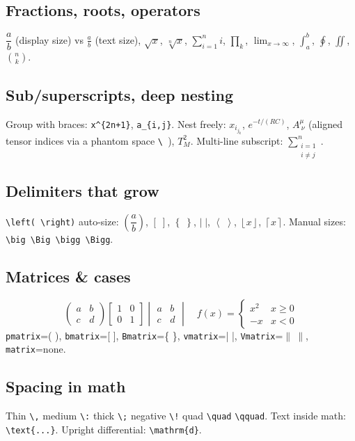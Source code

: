 \documentclass[11pt]{article}
\theoremstyle{plain}
\theoremstyle{definition}
\theoremstyle{remark}
\begin{document}
\subsection{Fractions, roots, operators}
$\dfrac{a}{b}$ (display size) vs $\tfrac{a}{b}$ (text size),
$\sqrt{x}$, $\sqrt[n]{x}$, $\displaystyle\sum_{i=1}^{n} i$,
$\displaystyle\prod_{k}$, $\displaystyle\lim_{x\to\infty}$,
$\displaystyle\int_a^b$, $\oint$, $\iint$, $\binom{n}{k}$.

\subsection{Sub/superscripts, deep nesting}
Group with braces: \verb|x^{2n+1}|, \verb|a_{i,j}|. Nest freely:
$x_{i_{j_{k}}}$, $e^{-t/(RC)}$, $A^{\mu}_{\ \nu}$ (aligned tensor indices
via a phantom space \verb|\ |), $T^{2}_{M}$. Multi-line subscript:
$\displaystyle\sum_{\substack{i=1\\ i\ne j}}^{n}$.

\subsection{Delimiters that grow}
\verb|\left( \right)| auto-size: $\left(\dfrac{a}{b}\right)$,
$\left[\;\right]$, $\left\{\;\right\}$, $\left|\;\right|$,
$\left\langle\;\right\rangle$, $\left\lfloor x \right\rfloor$,
$\left\lceil x \right\rceil$. Manual sizes: \verb|\big \Big \bigg \Bigg|.

\subsection{Matrices \& cases}
\[
  \begin{pmatrix} a & b \\ c & d \end{pmatrix}
  \begin{bmatrix} 1 & 0 \\ 0 & 1 \end{bmatrix}
  \begin{vmatrix} a & b \\ c & d \end{vmatrix}
  \quad
  f(x)=\begin{cases} x^2 & x\ge 0\\ -x & x<0 \end{cases}
\]
\texttt{pmatrix}=( ), \texttt{bmatrix}=[ ], \texttt{Bmatrix}=\{ \},
\texttt{vmatrix}=| |, \texttt{Vmatrix}=$\|\ \|$, \texttt{matrix}=none.

\subsection{Spacing in math}
Thin \verb|\,| medium \verb|\:| thick \verb|\;| negative \verb|\!| quad
\verb|\quad| \verb|\qquad|. Text inside math: \verb|\text{...}|.
Upright differential: \verb|\mathrm{d}|.
\end{document}
